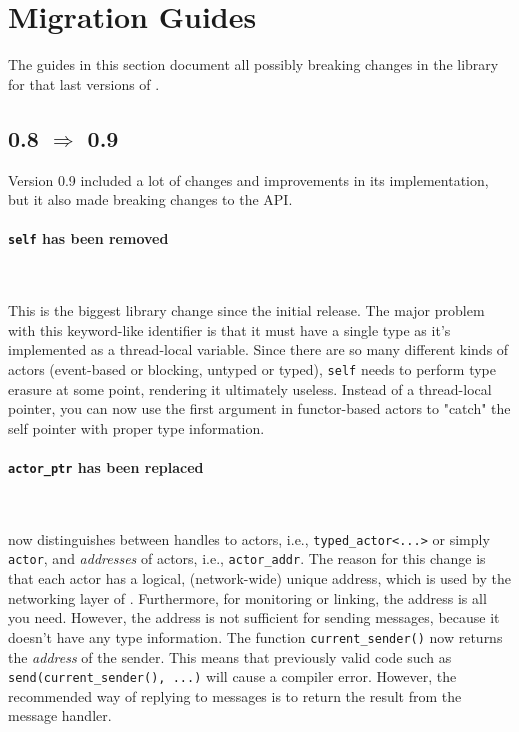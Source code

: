\section{Migration Guides}

The guides in this section document all possibly breaking changes in the library for that last versions of \lib.

\subsection{0.8 $\Rightarrow$ 0.9}

Version 0.9 included a lot of changes and improvements in its implementation, but it also made breaking changes to the API.

\paragraph{\lstinline^self^ has been removed}

~

This is the biggest library change since the initial release.
The major problem with this keyword-like identifier is that it must have a single type as it's implemented as a thread-local variable.
Since there are so many different kinds of actors (event-based or blocking, untyped or typed), \lstinline^self^ needs to perform type erasure at some point, rendering it ultimately useless.
Instead of a thread-local pointer, you can now use the first argument in functor-based actors to "catch" the self pointer with proper type information.

\paragraph{\lstinline^actor_ptr^ has been replaced}

~

\lib now distinguishes between handles to actors, i.e., \lstinline^typed_actor<...>^ or simply \lstinline^actor^, and \emph{addresses} of actors, i.e., \lstinline^actor_addr^. The reason for this change is that each actor has a logical, (network-wide) unique address, which is used by the networking layer of \lib. Furthermore, for monitoring or linking, the address is all you need. However, the address is not sufficient for sending messages, because it doesn't have any type information. The function \lstinline^current_sender()^ now returns the \emph{address} of the sender.
This means that previously valid code such as \lstinline^send(current_sender(), ...)^ will cause a compiler error.
However, the recommended way of replying to messages is to return the result from the message handler.

